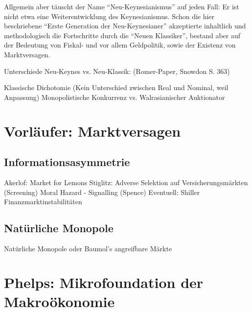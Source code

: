 Allgemein aber täuscht der Name "`Neu-Keynesianismus"' auf jeden Fall: Er ist nicht etwa eine Weiterentwicklung des Keynesianismus. Schon die hier beschriebene "`Erste Generation der Neu-Keynesianer"' akzeptierte inhaltlich und methodologisch die Fortschritte durch die "`Neuen Klassiker"', bestand aber auf der Bedeutung von Fiskal- und vor allem Geldpolitik, sowie der Existenz von Marktversagen. 

 
 Unterschiede Neu-Keynes vs. Neu-Klassik: (Romer-Paper, Snowdon S. 363)
 
 Klassische Dichotomie (Kein Unterschied zwischen Real und Nominal, weil Anpassung)
 Monopolistische Konkurrenz vs. Walrasianischer Auktionator
 
 
 
 
 
\section{Vorläufer: Marktversagen} \label{cha: Marktversagen}

\subsection{Informationsasymmetrie}
Akerlof: Market for Lemons
Stiglitz: Adverse Selektion auf Versicherungsmärkten (Screening)
Moral Hazard - Signalling (Spence)
Eventuell: Shiller Finanzmarktinstabilitäten

\subsection{Natürliche Monopole}
Natürliche Monopole oder Baumol's angreifbare Märkte



 
 
 

\section{Phelps: Mikrofoundation der Makroökonomie}
\label{micmac}

